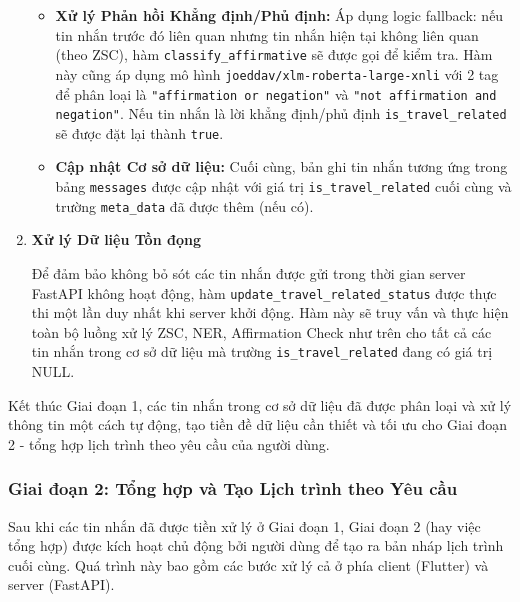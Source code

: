 \begin{enumerate}
\begin{itemize}
    \item \textbf{Xử lý Phản hồi Khẳng định/Phủ định:} Áp dụng logic fallback: nếu tin nhắn trước đó liên quan nhưng tin nhắn hiện tại không liên quan (theo ZSC), hàm \texttt{classify\_affirmative} sẽ được gọi để kiểm tra. Hàm này cũng áp dụng mô hình \texttt{joeddav/xlm-roberta-large-xnli} với 2 tag để phân loại là \texttt{"affirmation or negation"} và \texttt{"not affirmation and negation"}. Nếu tin nhắn là lời khẳng định/phủ định \texttt{is\_travel\_related} sẽ được đặt lại thành \texttt{true}.
    \item \textbf{Cập nhật Cơ sở dữ liệu:} Cuối cùng, bản ghi tin nhắn tương ứng trong bảng \texttt{messages} được cập nhật với giá trị \texttt{is\_travel\_related} cuối cùng và trường \texttt{meta\_data} đã được thêm (nếu có).
\end{itemize}

\item  \textbf{Xử lý Dữ liệu Tồn đọng}

\noindent Để đảm bảo không bỏ sót các tin nhắn được gửi trong thời gian server FastAPI không hoạt động, hàm \texttt{update\_travel\_related\_status} được thực thi một lần duy nhất khi server khởi động. Hàm này sẽ truy vấn và thực hiện toàn bộ luồng xử lý ZSC, NER, Affirmation Check như trên cho tất cả các tin nhắn trong cơ sở dữ liệu mà trường \texttt{is\_travel\_related} đang có giá trị NULL.

\end{enumerate}

\noindent Kết thúc Giai đoạn 1, các tin nhắn trong cơ sở dữ liệu đã được phân loại và xử lý thông tin một cách tự động, tạo tiền đề dữ liệu cần thiết và tối ưu cho Giai đoạn 2 - tổng hợp lịch trình theo yêu cầu của người dùng.

\subsubsection{Giai đoạn 2: Tổng hợp và Tạo Lịch trình theo Yêu cầu}
\label{subsubsec:summary_phase2}

Sau khi các tin nhắn đã được tiền xử lý ở Giai đoạn 1, Giai đoạn 2 (hay việc tổng hợp) được kích hoạt chủ động bởi người dùng để tạo ra bản nháp lịch trình cuối cùng. Quá trình này bao gồm các bước xử lý cả ở phía client (Flutter) và server (FastAPI).

